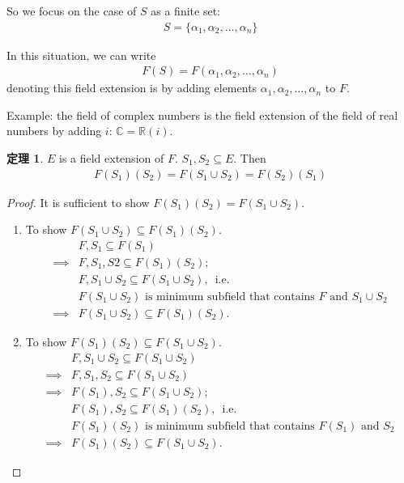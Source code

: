 \documentclass[utf8]{ctexbook}
\theoremstyle{definition}
\newtheorem{prototheorem}{定理}[section]
\newenvironment{theorem}
   {\colorlet{shadecolor}{red!30}\begin{shaded}\begin{prototheorem}}
   {\end{prototheorem}\end{shaded}}
\begin{document}
So we focus on the case of $S$ as a finite set:
\begin{align*}
S = \{ \alpha_1, \alpha_2, \ldots, \alpha_n \}
\end{align*}

In this situation, we can write
\begin{align*}
F(S) = F(\alpha_1, \alpha_2, \ldots, \alpha_n )
\end{align*}
denoting this field extension is by adding elements $\alpha_1, \alpha_2, \ldots, \alpha_n $ to $F$.

Example: the field of complex numbers is the field extension of the field of real numbers by adding $i$: $\mathbb{C} = \mathbb{R}(i)$.


\begin{theorem}
\label{thm_4_3_field_extension_sets_union}
$E$ is a field extension of $F$. $S_1, S_2 \subseteq E$. Then
\begin{align*}
F(S_1)(S_2) = F(S_1 \cup S_2) = F(S_2)(S_1)
\end{align*}
\end{theorem}

\begin{proof}
It is sufficient to show $F(S_1)(S_2) = F(S_1 \cup S_2)$.

\begin{enumerate}
\item{To show $F(S_1 \cup S_2) \subseteq F(S_1)(S_2)$.
\begin{align*}
& F, S_1 \subseteq F(S_1) \\
\implies & F, S_1, S2 \subseteq F(S_1)(S_2) ; \\
& F, S_1 \cup S_2 \subseteq F(S_1 \cup S_2),\, \mbox{ i.e.} \\
& F(S_1 \cup S_2) \mbox{ is minimum subfield that contains $F$ and $S_1 \cup S_2$} \\
\implies & F(S_1 \cup S_2) \subseteq F(S_1)(S_2).
\end{align*}

}
\item{To show $ F(S_1)(S_2) \subseteq F(S_1 \cup S_2)$.
\begin{align*}
& F, S_1 \cup S_2 \subseteq F(S_1 \cup S_2) \\
\implies & F, S_1, S_2 \subseteq F(S_1 \cup S_2) \\
\implies & F(S_1), S_2 \subseteq F(S_1 \cup S_2); \\
& F(S_1), S_2 \subseteq F(S_1)(S_2),\, \mbox{ i.e.}  \\
& F(S_1 )( S_2) \mbox{ is minimum subfield that contains $F(S_1)$ and $S_2$} \\
\implies &  F(S_1 )( S_2) \subseteq F(S_1 \cup S_2) .
\end{align*}
}
\end{enumerate}

\end{proof}
\end{document}
